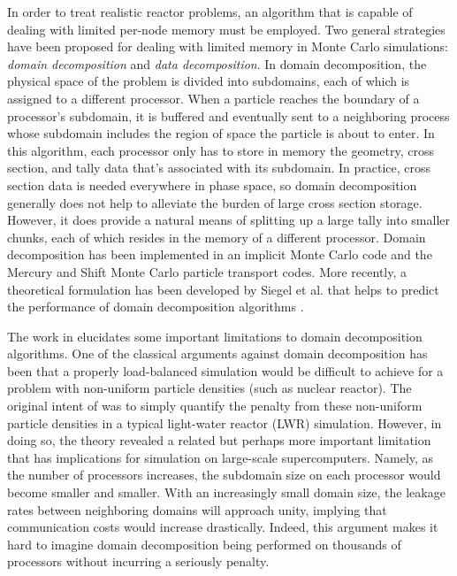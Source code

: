 \documentclass[3p]{elsarticle}
\begin{document}
In order to treat realistic reactor problems, an algorithm that is capable of
dealing with limited per-node memory must be employed. Two general strategies
have been proposed for dealing with limited memory in Monte Carlo simulations:
{\em domain decomposition} and {\em data decomposition}. In domain
decomposition, the physical space of the problem is divided into subdomains,
each of which is assigned to a different processor. When a particle reaches the
boundary of a processor's subdomain, it is buffered and eventually sent to a
neighboring process whose subdomain includes the region of space the particle is
about to enter. In this algorithm, each processor only has to store in memory
the geometry, cross section, and tally data that's associated with its
subdomain. In practice, cross section data is needed everywhere in phase space,
so domain decomposition generally does not help to alleviate the burden of large
cross section storage. However, it does provide a natural means of splitting up
a large tally into smaller chunks, each of which resides in the memory of a
different processor. Domain decomposition has been implemented in an implicit
Monte Carlo code \cite{jcp-brunner-2009} and the Mercury \cite{mc09-greenman}
and Shift \cite{physor2012-mervin} Monte Carlo particle transport codes. More
recently, a theoretical formulation has been developed by Siegel et al. that
helps to predict the performance of domain decomposition algorithms
\cite{jcp-siegel-2012-1, jcp-siegel-2012-2}.

The work in \cite{jcp-siegel-2012-2} elucidates some important limitations to
domain decomposition algorithms. One of the classical arguments against domain
decomposition has been that a properly load-balanced simulation would be
difficult to achieve for a problem with non-uniform particle densities (such as
nuclear reactor). The original intent of \cite{jcp-siegel-2012-2} was to simply
quantify the penalty from these non-uniform particle densities in a typical
light-water reactor (LWR) simulation. However, in doing so, the theory revealed
a related but perhaps more important limitation that has implications for
simulation on large-scale supercomputers. Namely, as the number of processors
increases, the subdomain size on each processor would become smaller and
smaller. With an increasingly small domain size, the leakage rates between
neighboring domains will approach unity, implying that communication costs would
increase drastically. Indeed, this argument makes it hard to imagine domain
decomposition being performed on thousands of processors without incurring a
seriously penalty.
\end{document}

